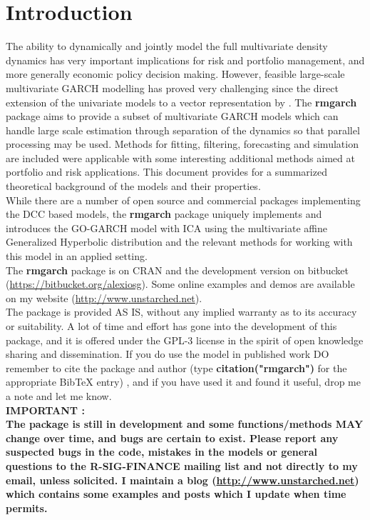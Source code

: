 \section{Introduction}
The ability to dynamically and jointly model the full multivariate density
dynamics has very important implications for risk and portfolio management,
and more generally economic policy decision making. However, feasible large-scale
multivariate GARCH modelling has proved very challenging since the direct extension
of the univariate models to a vector representation by \cite{Bollerslev1988}.
The {\bf rmgarch} package aims to provide a subset of multivariate GARCH models
which can handle large scale estimation through separation of the dynamics
so that parallel processing may be used. Methods for fitting, filtering,
forecasting and simulation are included were applicable with some interesting
additional methods aimed at portfolio and risk applications. This document provides
for a summarized theoretical background of the models and their properties.\\
While there are a number of open source and commercial packages implementing the
DCC based models, the {\bf rmgarch} package uniquely implements and introduces
the GO-GARCH model with ICA using the multivariate affine Generalized Hyperbolic
distribution and the relevant methods for working with this model in an applied setting.\\
The {\bf rmgarch} package is on CRAN and the development version on
bitbucket (\url{https://bitbucket.org/alexiosg}). Some online examples and demos
are available on my website (\url{http://www.unstarched.net}).\\
The package is provided AS IS, without any implied warranty as to its accuracy
or suitability. A lot of time and effort has gone into the development of this
package, and it is offered under the GPL-3 license in the spirit of open knowledge
sharing and dissemination. If you do use the model in published work DO remember
to cite the package and author (type {\bf citation("rmgarch")} for the
appropriate BibTeX entry) , and if you have used it and found it useful, drop me
a note and let me know.\\
\textbf{ IMPORTANT :\\
The package is still in development and some functions/methods MAY change over time,
and bugs are certain to exist. Please report any suspected bugs in the code, mistakes
in the models or general questions to the R-SIG-FINANCE mailing list and not directly
to my email, unless solicited. I maintain a blog (\url{http://www.unstarched.net})
which contains some examples and posts which I update when time permits.}

